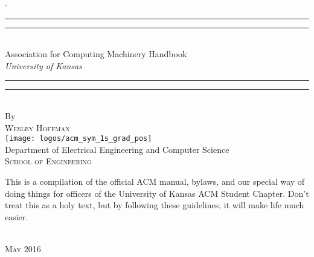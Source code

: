 %
%
%
%
%
\begin{titlingpage}
\begin{SingleSpace}
\calccentering{\unitlength}
\begin{adjustwidth*}{\unitlength}{-\unitlength}
\vspace*{13mm}
\begin{center}
\rule[0.5ex]{\linewidth}{2pt}\vspace*{-\baselineskip}\vspace*{3.2pt}
\rule[0.5ex]{\linewidth}{1pt}\\[\baselineskip]
{\HUGE Association for Computing Machinery Handbook }\\[4mm]
{\Large \textit{University of Kansas}}\\
\rule[0.5ex]{\linewidth}{1pt}\vspace*{-\baselineskip}\vspace{3.2pt}
\rule[0.5ex]{\linewidth}{2pt}\\
\vspace{6.5mm}
{\large By}\\
\vspace{6.5mm}
{\large\textsc{Wesley Hoffman}}\\
\vspace{11mm}
\texttt{[image: logos/acm\_sym\_1s\_grad\_pos]}\\
\vspace{6mm}
{\large Department of Electrical Engineering and Computer Science\\
\textsc{School of Engineering}}\\
\vspace{11mm}
\begin{minipage}{10cm}
This is a compilation of the official ACM manual, bylaws, and our special way of
doing things for officers of the University of Kansas ACM Student Chapter. Don't
treat this as a holy text, but by following these guidelines, it will make life
much easier.
\end{minipage}\\
\vspace{9mm}
{\large\textsc{May 2016}}
\vspace{12mm}
\end{center}
\end{adjustwidth*}
\end{SingleSpace}
\end{titlingpage}
